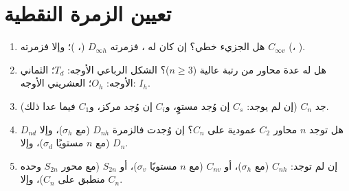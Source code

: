 \section{تعيين الزمرة النقطية}

\begin{method}\label{met:b3:point-groups:assign}
\begin{enumerate}
  \item هل الجزيء خطي؟ إن كان له ، فزمرته $D_{\infty h}$
        (، )؛ وإلا فزمرته $C_{\infty v}$ (، ).
  \item هل له عدة محاور من رتبة عالية ($n \ge 3$)؟ الشكل الرباعي الأوجه:
        $T_d$؛ الثماني الأوجه: $O_h$؛ العشريني الأوجه: $I_h$.
  \item جد  $C_n$ (إن لم يوجد: $C_s$ إن وُجد مستوٍ، و$C_i$ إن وُجد
        مركز، و$C_1$ فيما عدا ذلك).
  \item هل توجد $n$ محاور $C_2$ عمودية على $C_n$؟ إن وُجدت فالزمرة
        $D_{nh}$ (مع $\sigma_h$)، وإلا $D_{nd}$ (مع $n$ مستويًا $\sigma_d$)، وإلا
        $D_n$.
  \item إن لم توجد: $C_{nh}$ (مع $\sigma_h$)، أو $C_{nv}$ (مع $n$ مستويًا $\sigma_v$)، أو $S_{2n}$
        (مع محور $S_{2n}$ وحده منطبق على $C_n$)، وإلا $C_n$.
\end{enumerate}
\end{method}

